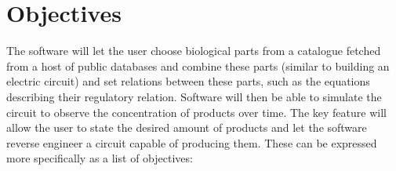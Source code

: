 \documentclass{article}
\begin{document}
	\section{Objectives}
		\par The software will let the user choose biological parts from a catalogue fetched from a host of public databases and combine these parts (similar to building an electric circuit) and set relations between these parts, such as the equations describing their regulatory relation. Software will then be able to simulate the circuit to observe the concentration of products over time. The key feature will allow the user to state the desired amount of products and let the software reverse engineer a circuit capable of producing them. These can be expressed more specifically as a list of objectives:
		
\end{document}
